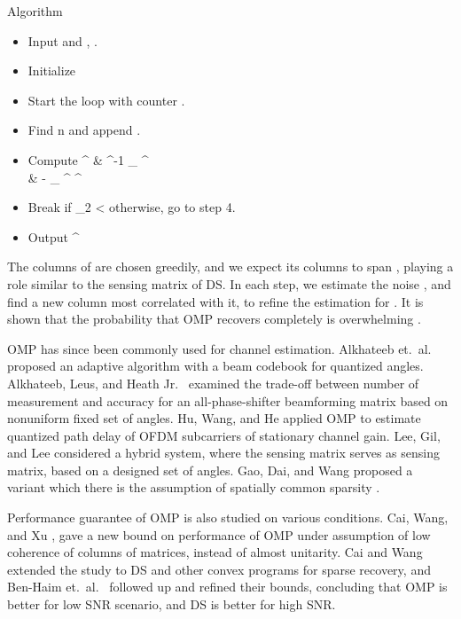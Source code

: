 \Result
{Algorithm}
{
\begin {itemize}
%
\item Input  and , .
%
\item Initialize
%
%
\item Start the loop with counter .
%
\item Find
%
 {
n
\leftarrow {} {}
}
%
and append .
%
\item Compute
%
 {
 ^\ddagger
\leftarrow & ^{-1}  _{} ^\dagger \\
%
\leftarrow & - _{} ^\dagger {} ^\ddagger {} 
}
%
\item Break if
%
 {
 _2
<\eta 
}
%
otherwise, go to step 4.
%
\item Output 
%
 {
\leftarrow {} ^\ddagger {} 
}
\end {itemize}
}
%
The columns of  are chosen greedily, and we expect its columns to span , playing a role similar to the sensing matrix of DS.
In each step, we estimate the noise , and find a new column most correlated with it, to refine the estimation for .
It is shown that the probability that OMP recovers  completely is overwhelming \cite {TrG07a}.

OMP has since been commonly used for channel estimation.
Alkhateeb et.\ al.\ \cite {AEL14} proposed an adaptive algorithm with a beam codebook for quantized angles.
Alkhateeb, Leus, and Heath Jr.\ \cite {ALH15} examined the trade-off between number of measurement and accuracy for an all-phase-shifter beamforming matrix based on nonuniform fixed set of angles.
Hu, Wang, and He \cite {HWH13} applied OMP to estimate quantized path delay of OFDM subcarriers of stationary channel gain.
Lee, Gil, and Lee \cite {LGL16} considered a hybrid system, where the sensing matrix serves as sensing matrix, based on a designed set of angles.
Gao, Dai, and Wang proposed a variant which there is the assumption of spatially common sparsity \cite {GDW15}.

Performance guarantee of OMP is also studied on various conditions.
Cai, Wang, and Xu \cite {CWX10}, gave a new bound on performance of OMP under assumption of low coherence of columns of matrices, instead of almost unitarity.
Cai and Wang \cite {CaW11} extended the study to DS and other convex programs for sparse recovery, and Ben-Haim et.\ al.\ \cite {BEE10} followed up and refined their bounds, concluding that OMP is better for low SNR scenario, and DS is better for high SNR.

